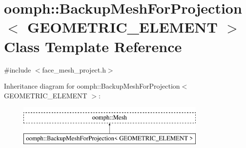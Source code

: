 \hypertarget{classoomph_1_1BackupMeshForProjection}{}\section{oomph\+:\+:Backup\+Mesh\+For\+Projection$<$ G\+E\+O\+M\+E\+T\+R\+I\+C\+\_\+\+E\+L\+E\+M\+E\+NT $>$ Class Template Reference}
\label{classoomph_1_1BackupMeshForProjection}


{\ttfamily \#include $<$face\+\_\+mesh\+\_\+project.\+h$>$}

Inheritance diagram for oomph\+:\+:Backup\+Mesh\+For\+Projection$<$ G\+E\+O\+M\+E\+T\+R\+I\+C\+\_\+\+E\+L\+E\+M\+E\+NT $>$\+:\begin{figure}[H]
\begin{center}
\leavevmode
\includegraphics[height=2.000000cm]{classoomph_1_1BackupMeshForProjection}
\end{center}
\end{figure}
